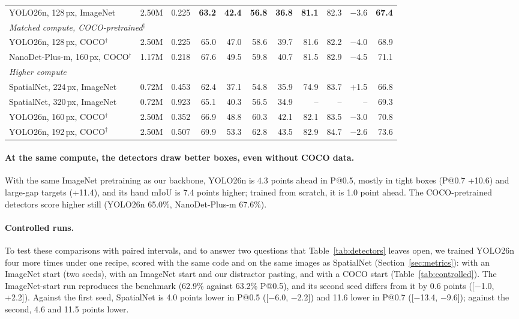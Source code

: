\begin{table}[t]
\begin{tabular}{lrrrrrrrrrr}
    YOLO26n, 128\,px, ImageNet & 2.50M & 0.225 & \textbf{63.2} & \textbf{42.4} & \textbf{56.8} & \textbf{36.8} & \textbf{81.1} & 82.3 & $-$3.6 & \textbf{67.4} \\
    \multicolumn{11}{l}{\emph{Matched compute, COCO-pretrained}$^\dagger$} \\
    YOLO26n, 128\,px, COCO$^\dagger$ & 2.50M & 0.225 & 65.0 & 47.0 & 58.6 & 39.7 & 81.6 & 82.2 & $-$4.0 & 68.9 \\
    NanoDet-Plus-m, 160\,px, COCO$^\dagger$ & 1.17M & 0.218 & 67.6 & 49.5 & 59.8 & 40.7 & 81.5 & 82.9 & $-$4.5 & 71.1 \\
    \midrule
    \multicolumn{11}{l}{\emph{Higher compute}} \\
    SpatialNet, 224\,px, ImageNet & 0.72M & 0.453 & 62.4 & 37.1 & 54.8 & 35.9 & 74.9 & 83.7 & $+$1.5 & 66.8 \\
    SpatialNet, 320\,px, ImageNet & 0.72M & 0.923 & 65.1 & 40.3 & 56.5 & 34.9 & -- & -- & -- & 69.3 \\
    YOLO26n, 160\,px, COCO$^\dagger$ & 2.50M & 0.352 & 66.9 & 48.8 & 60.3 & 42.1 & 82.1 & 83.5 & $-$3.0 & 70.8 \\
    YOLO26n, 192\,px, COCO$^\dagger$ & 2.50M & 0.507 & 69.9 & 53.3 & 62.8 & 43.5 & 82.9 & 84.7 & $-$2.6 & 73.6 \\
    \bottomrule
  \end{tabular}
\end{table}

\paragraph{At the same compute, the detectors draw better boxes, even without COCO data.} With the same ImageNet pretraining as our backbone, YOLO26n is 4.3 points ahead in P@0.5, mostly in tight boxes (P@0.7 +10.6) and large-gap targets (+11.4), and its hand mIoU is 7.4 points higher; trained from scratch, it is 1.0 point ahead. The COCO-pretrained detectors score higher still (YOLO26n 65.0\%, NanoDet-Plus-m 67.6\%).

\paragraph{Controlled runs.} To test these comparisons with paired intervals, and to answer two questions that Table~\ref{tab:detectors} leaves open, we trained YOLO26n four more times under one recipe, scored with the same code and on the same images as SpatialNet (Section~\ref{sec:metrics}): with an ImageNet start (two seeds), with an ImageNet start and our distractor pasting, and with a COCO start (Table~\ref{tab:controlled}). The ImageNet-start run reproduces the benchmark (62.9\% against 63.2\% P@0.5), and its second seed differs from it by 0.6 points ([$-$1.0, +2.2]). Against the first seed, SpatialNet is 4.0 points lower in P@0.5 ([$-$6.0, $-$2.2]) and 11.6 lower in P@0.7 ([$-$13.4, $-$9.6]); against the second, 4.6 and 11.5 points lower.

